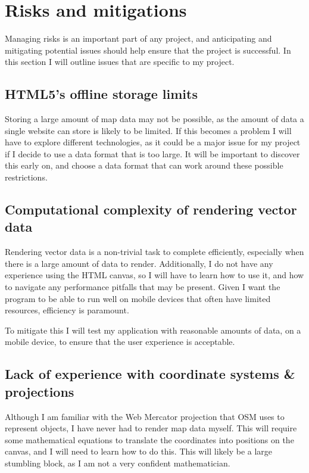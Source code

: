 \documentclass[]{final_report}
\begin{document}
\chapter{Risks and mitigations}

Managing risks is an important part of any project, and anticipating and mitigating potential issues should help ensure that the project is successful. In this section I will outline issues that are specific to my project.

\section{HTML5's offline storage limits}\label{sec:html5-storage-limits}

Storing a large amount of map data may not be possible, as the amount of data a single website can store is likely to be limited. If this becomes a problem I will have to explore different technologies, as it could be a major issue for my project if I decide to use a data format that is too large. It will be important to discover this early on, and choose a data format that can work around these possible restrictions.

\section{Computational complexity of rendering vector data}

Rendering vector data is a non-trivial task to complete efficiently, especially when there is a large amount of data to render. Additionally, I do not have any experience using the HTML canvas, so I will have to learn how to use it, and how to navigate any performance pitfalls that may be present. Given I want the program to be able to run well on mobile devices that often have limited resources, efficiency is paramount. 

To mitigate this I will test my application with reasonable amounts of data, on a mobile device, to ensure that the user experience is acceptable. 

\section{Lack of experience with coordinate systems \& projections}\label{sec:coordinate-systems}

Although I am familiar with the Web Mercator projection that OSM uses to represent objects, I have never had to render map data myself. This will require some mathematical equations to translate the coordinates into positions on the canvas, and I will need to learn how to do this. This will likely be a large stumbling block, as I am not a very confident mathematician.
\end{document}
